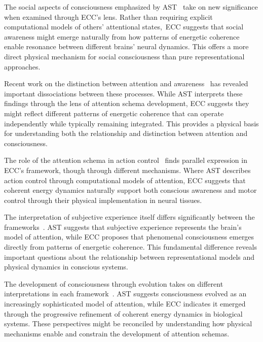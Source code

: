 The social aspects of consciousness emphasized by AST~\cite{Kelly2014, Graziano2019} take on new significance when examined through ECC's lens. Rather than requiring explicit computational models of others' attentional states,~ECC suggests that social awareness might emerge naturally from how patterns of energetic coherence enable resonance between different brains' neural dynamics. This offers a more direct physical mechanism for social consciousness than pure representational approaches.

Recent work on the distinction between attention and awareness~\cite{Webb2016, Lamme2006} has revealed important dissociations between these processes. While AST interprets these findings through the lens of attention schema development, ECC suggests they might reflect different patterns of energetic coherence that can operate independently while typically remaining integrated. This provides a physical basis for understanding both the relationship and distinction between attention and consciousness.

The role of the attention schema in action control~\cite{WebbKemper2020, Graziano2002} finds parallel expression in ECC's framework, though through different mechanisms. Where AST describes action control through computational models of attention, ECC suggests that coherent energy dynamics naturally support both conscious awareness and motor control through their physical implementation in neural tissues.

The interpretation of subjective experience itself differs significantly between the frameworks~\cite{Graziano2019, Block2007}. AST suggests that subjective experience represents the brain's model of attention, while ECC proposes that phenomenal consciousness emerges directly from patterns of energetic coherence. This fundamental difference reveals important questions about the relationship between representational models and physical dynamics in conscious systems.

The development of consciousness through evolution takes on different interpretations in each framework~\cite{Graziano2013, Thompson2018}. AST suggests consciousness evolved as an increasingly sophisticated model of attention, while ECC indicates it emerged through the progressive refinement of coherent energy dynamics in biological systems. These perspectives might be reconciled by understanding how physical mechanisms enable and constrain the development of attention schemas.

